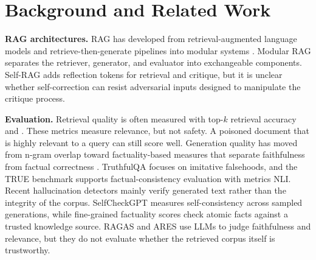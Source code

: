 \section{Background and Related Work}
\label{sec:background}

\textbf{RAG architectures.} RAG has developed from retrieval-augmented language models \cite{guu2020realm} and retrieve-then-generate pipelines \cite{izacard2021fid} into modular systems \cite{gao2024retrieval}. Modular RAG separates the retriever, generator, and evaluator into exchangeable components. Self-RAG \cite{asai2024selfrag} adds reflection tokens for retrieval and critique, but it is unclear whether self-correction can resist adversarial inputs designed to manipulate the critique process.

\textbf{Evaluation.} Retrieval quality is often measured with  top-$k$ retrieval accuracy \cite{karpukhin2020dense} and . These metrics measure relevance, but not safety. A poisoned document that is highly relevant to a query can still score well. Generation quality has moved from n-gram overlap toward factuality-based measures that separate faithfulness from factual correctness \cite{maynez2020faithfulness}. TruthfulQA \cite{lin2022truthfulqa} focuses on imitative falsehoods, and the TRUE benchmark \cite{honovich2022true} supports factual-consistency evaluation with metrics NLI. Recent hallucination detectors mainly verify generated text rather than the integrity of the corpus. SelfCheckGPT \cite{manakul2023selfcheckgpt} measures self-consistency across sampled generations, while fine-grained factuality scores \cite{min2023factscore} check atomic facts against a trusted knowledge source. RAGAS \cite{es2024ragas} and ARES \cite{saadfalcon2024ares} use LLMs to judge faithfulness and relevance, but they do not evaluate whether the retrieved corpus itself is trustworthy.

